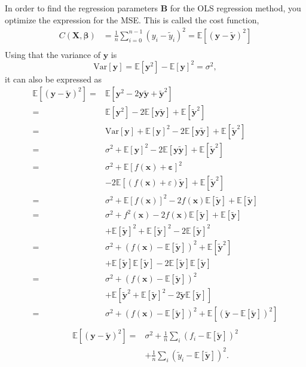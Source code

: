 \documentclass[a4paper, 10pt]{article}
\begin{document}
\begin{multicols}{2}
In order to find the regression parameters $\bm{B}$ for the OLS regression method, you optimize the expression for the MSE. This is called the cost function, 
\begin{align*}
C(\bm{X},\bm{\beta} ) &= \frac{1}{n}\sum_{i=0}^{n-1}(y_i-\tilde{y}_i)^2 = \mathbb{E}[	(\bm{y}-\bm{\tilde{y}})^2] \\
\end{align*}
Using that the variance of $\bm{y}$ is $$\text{Var}[\bm{y}] = \mathbb{E}[\bm{y}^2]-\mathbb{E}[\bm{y}]^2=\sigma^2,$$ it can also be expressed as 
\begin{align*}
\mathbb{E}[	(\bm{y}-\bm{\tilde{y}})^2] =& \mathbb{E}[\bm{y}^2  -2\bm{y}\bm{\tilde{y}}+ \bm { \tilde{y} } ^2 ] \\
=& \mathbb{E}[\bm{y}^2]  - 2\mathbb{E}[\bm{y\tilde{y}}]+\mathbb{E}[\bm{\tilde{y}}^2]\\
=& \text{Var}[\bm{y}] + \mathbb{E}[\bm{y}]^2-2\mathbb{E}[\bm{y\tilde{y}}]+\mathbb{E}[\bm{\tilde{y}}^2]\\
=& \sigma^2 +  \mathbb{E}[\bm{y}]^2  -2 \mathbb{E}[\bm{y}\bm{\tilde{y}}] +  \mathbb{E}[\bm{\tilde{y}}^2]\\
=& \sigma^2 +  \mathbb{E}[f(\bm{x}) + \bm{\varepsilon}]^2 \\&- 2 \mathbb{E} [(f(\bm{x})+\varepsilon)\bm{\tilde{y}}] +  \mathbb{E}[\bm{\tilde{y}}^2 ]\\
=& \sigma^2 +  \mathbb{E}[f(\bm{x})]^2 -2f(\bm{x}) \mathbb{E}[\bm{\tilde{y}}] +  \mathbb{E}[\bm{\tilde{y}}] \\
=&\sigma^2 + f^2(\bm{x})-2f(\bm{x}) \mathbb{E}[\bm{\tilde{y}}] +  \mathbb{E}[\bm{\tilde{y}}]\\&+\mathbb{E}[\bm{\tilde{y}}]^2 + \mathbb{E}[\bm{\tilde{y}}]^2 -2\mathbb{E}[\bm{\tilde{y}}]^2\\
=&  \sigma ^2  + ( f(\bm{x}) -\mathbb{E}[\bm{\tilde{y}}]  )^2 + \mathbb{E}[\bm{\tilde{y}}^2] \\&+\mathbb{E}[\bm{\tilde{y}}]\mathbb{E}[\bm{\tilde{y}}]  - 2\mathbb{E}[\bm{\tilde{y}}]\mathbb{E}[\bm{\tilde{y}}]\\
= &  \sigma^2 +  ( f(\bm{x}) -\mathbb{E}[\bm{\tilde{y}}]  )^2   \\&+ \mathbb{E}[\bm{\tilde{y}}^2 + \mathbb{E}[\bm{\tilde{y}}]^2 - 2\bm{\tilde{y}}\mathbb{E}[\bm{\tilde{y}}]]\\
=&  \sigma^2 +  ( f(\bm{x}) -\mathbb{E}[\bm{\tilde{y}}]  )^2  +\mathbb{E}[(\bm{\tilde{y}} -\mathbb{E}[\bm{\tilde{y}}])^2] \\
\end{align*}
\begin{align}
 \mathbb{E}[	(\bm{y}-\bm{\tilde{y}})^2]  =&\sigma^2 + \frac{1}{n}\sum_i(f_i-\mathbb{E}\left[\bm{\tilde{y}}\right])^2  \nonumber \\
 &+ \frac{1}{n}\sum_i(\tilde{y}_i-\mathbb{E}\left[\bm{\tilde{y}}\right])^2.
\end{align}




\end{multicols}
\end{document}
